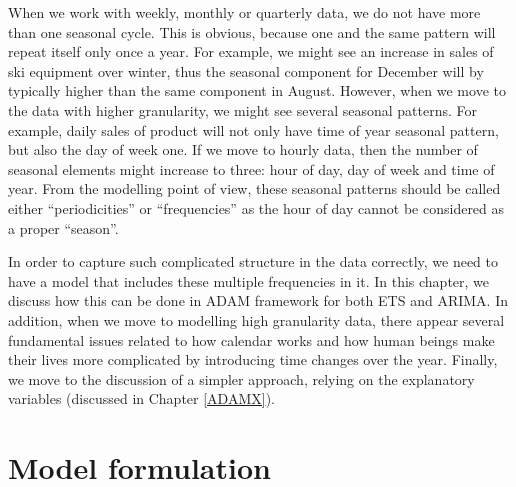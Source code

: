 \documentclass[
]{book}
\theoremstyle{definition}
\theoremstyle{definition}
\theoremstyle{definition}
\theoremstyle{definition}
\theoremstyle{remark}
\begin{document}
When we work with weekly, monthly or quarterly data, we do not have more than one seasonal cycle. This is obvious, because one and the same pattern will repeat itself only once a year. For example, we might see an increase in sales of ski equipment over winter, thus the seasonal component for December will by typically higher than the same component in August. However, when we move to the data with higher granularity, we might see several seasonal patterns. For example, daily sales of product will not only have time of year seasonal pattern, but also the day of week one. If we move to hourly data, then the number of seasonal elements might increase to three: hour of day, day of week and time of year. From the modelling point of view, these seasonal patterns should be called either ``periodicities'' or ``frequencies'' as the hour of day cannot be considered as a proper ``season''.

In order to capture such complicated structure in the data correctly, we need to have a model that includes these multiple frequencies in it. In this chapter, we discuss how this can be done in ADAM framework for both ETS and ARIMA. In addition, when we move to modelling high granularity data, there appear several fundamental issues related to how calendar works and how human beings make their lives more complicated by introducing time changes over the year. Finally, we move to the discussion of a simpler approach, relying on the explanatory variables (discussed in Chapter \ref{ADAMX}).

\hypertarget{model-formulation}{%
\section{Model formulation}\label{model-formulation}}
\end{document}
